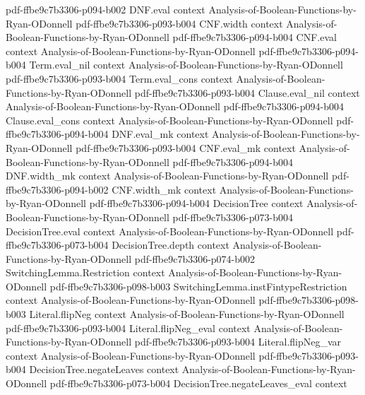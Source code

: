 \begin{theorem}
  {pdf-ffbe9c7b3306-p094-b002}
\proofstep
  {DNF.eval}
  {context}
  {Analysis-of-Boolean-Functions-by-Ryan-ODonnell}
  {pdf-ffbe9c7b3306-p093-b004}
\proofstep
  {CNF.width}
  {context}
  {Analysis-of-Boolean-Functions-by-Ryan-ODonnell}
  {pdf-ffbe9c7b3306-p094-b004}
\proofstep
  {CNF.eval}
  {context}
  {Analysis-of-Boolean-Functions-by-Ryan-ODonnell}
  {pdf-ffbe9c7b3306-p094-b004}
\proofstep
  {Term.eval_nil}
  {context}
  {Analysis-of-Boolean-Functions-by-Ryan-ODonnell}
  {pdf-ffbe9c7b3306-p093-b004}
\proofstep
  {Term.eval_cons}
  {context}
  {Analysis-of-Boolean-Functions-by-Ryan-ODonnell}
  {pdf-ffbe9c7b3306-p093-b004}
\proofstep
  {Clause.eval_nil}
  {context}
  {Analysis-of-Boolean-Functions-by-Ryan-ODonnell}
  {pdf-ffbe9c7b3306-p094-b004}
\proofstep
  {Clause.eval_cons}
  {context}
  {Analysis-of-Boolean-Functions-by-Ryan-ODonnell}
  {pdf-ffbe9c7b3306-p094-b004}
\proofstep
  {DNF.eval_mk}
  {context}
  {Analysis-of-Boolean-Functions-by-Ryan-ODonnell}
  {pdf-ffbe9c7b3306-p093-b004}
\proofstep
  {CNF.eval_mk}
  {context}
  {Analysis-of-Boolean-Functions-by-Ryan-ODonnell}
  {pdf-ffbe9c7b3306-p094-b004}
\proofstep
  {DNF.width_mk}
  {context}
  {Analysis-of-Boolean-Functions-by-Ryan-ODonnell}
  {pdf-ffbe9c7b3306-p094-b002}
\proofstep
  {CNF.width_mk}
  {context}
  {Analysis-of-Boolean-Functions-by-Ryan-ODonnell}
  {pdf-ffbe9c7b3306-p094-b004}
\proofstep
  {DecisionTree}
  {context}
  {Analysis-of-Boolean-Functions-by-Ryan-ODonnell}
  {pdf-ffbe9c7b3306-p073-b004}
\proofstep
  {DecisionTree.eval}
  {context}
  {Analysis-of-Boolean-Functions-by-Ryan-ODonnell}
  {pdf-ffbe9c7b3306-p073-b004}
\proofstep
  {DecisionTree.depth}
  {context}
  {Analysis-of-Boolean-Functions-by-Ryan-ODonnell}
  {pdf-ffbe9c7b3306-p074-b002}
\proofstep
  {SwitchingLemma.Restriction}
  {context}
  {Analysis-of-Boolean-Functions-by-Ryan-ODonnell}
  {pdf-ffbe9c7b3306-p098-b003}
\proofstep
  {SwitchingLemma.instFintypeRestriction}
  {context}
  {Analysis-of-Boolean-Functions-by-Ryan-ODonnell}
  {pdf-ffbe9c7b3306-p098-b003}
\proofstep
  {Literal.flipNeg}
  {context}
  {Analysis-of-Boolean-Functions-by-Ryan-ODonnell}
  {pdf-ffbe9c7b3306-p093-b004}
\proofstep
  {Literal.flipNeg_eval}
  {context}
  {Analysis-of-Boolean-Functions-by-Ryan-ODonnell}
  {pdf-ffbe9c7b3306-p093-b004}
\proofstep
  {Literal.flipNeg_var}
  {context}
  {Analysis-of-Boolean-Functions-by-Ryan-ODonnell}
  {pdf-ffbe9c7b3306-p093-b004}
\proofstep
  {DecisionTree.negateLeaves}
  {context}
  {Analysis-of-Boolean-Functions-by-Ryan-ODonnell}
  {pdf-ffbe9c7b3306-p073-b004}
\proofstep
  {DecisionTree.negateLeaves_eval}
  {context}

\end{theorem}
